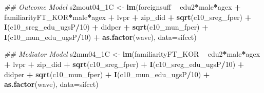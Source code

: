 \documentclass[
]{article}
\newenvironment{Shaded}{\begin{snugshade}}{\end{snugshade}}
\newcommand{\CommentTok}[1]{\textcolor[rgb]{0.56,0.35,0.01}{\textit{#1}}}
\newcommand{\DataTypeTok}[1]{\textcolor[rgb]{0.13,0.29,0.53}{#1}}
\newcommand{\DecValTok}[1]{\textcolor[rgb]{0.00,0.00,0.81}{#1}}
\newcommand{\KeywordTok}[1]{\textcolor[rgb]{0.13,0.29,0.53}{\textbf{#1}}}
\newcommand{\NormalTok}[1]{#1}
\newcommand{\OperatorTok}[1]{\textcolor[rgb]{0.81,0.36,0.00}{\textbf{#1}}}
\newcommand{\StringTok}[1]{\textcolor[rgb]{0.31,0.60,0.02}{#1}}
\begin{document}
\begin{Shaded}
\begin{Highlighting}[]
\CommentTok{## Outcome Model }
\NormalTok{s2mout04_1C <-}\StringTok{ }\KeywordTok{lm}\NormalTok{(foreignsuff  }\OperatorTok{~}\StringTok{ }\NormalTok{edu2}\OperatorTok{*}\NormalTok{male}\OperatorTok{*}\NormalTok{agex }\OperatorTok{+}\StringTok{ }\NormalTok{familiarityFT_KOR}\OperatorTok{*}\NormalTok{male}\OperatorTok{*}\NormalTok{agex }\OperatorTok{+}\StringTok{ }\NormalTok{lvpr }\OperatorTok{+}\StringTok{  }
\StringTok{                    }\NormalTok{zip_did }\OperatorTok{+}\StringTok{ }\KeywordTok{sqrt}\NormalTok{(c10_sreg_fper) }\OperatorTok{+}\StringTok{ }\KeywordTok{I}\NormalTok{(c10_sreg_edu_ugsP}\OperatorTok{/}\DecValTok{10}\NormalTok{) }\OperatorTok{+}\StringTok{ }
\StringTok{                    }\NormalTok{didper }\OperatorTok{+}\StringTok{ }\KeywordTok{sqrt}\NormalTok{(c10_mun_fper) }\OperatorTok{+}\StringTok{ }\KeywordTok{I}\NormalTok{(c10_mun_edu_ugsP}\OperatorTok{/}\DecValTok{10}\NormalTok{) }\OperatorTok{+}\StringTok{ }
\StringTok{                    }\KeywordTok{as.factor}\NormalTok{(wave), }\DataTypeTok{data=}\NormalTok{sifcct)}

\CommentTok{## Mediator Model}
\NormalTok{s2mm04_1C <-}\StringTok{ }\KeywordTok{lm}\NormalTok{(familiarityFT_KOR  }\OperatorTok{~}\StringTok{ }\NormalTok{edu2}\OperatorTok{*}\NormalTok{male}\OperatorTok{*}\NormalTok{agex }\OperatorTok{+}\StringTok{ }\NormalTok{lvpr }\OperatorTok{+}\StringTok{  }
\StringTok{                  }\NormalTok{zip_did }\OperatorTok{+}\StringTok{ }\KeywordTok{sqrt}\NormalTok{(c10_sreg_fper) }\OperatorTok{+}\StringTok{ }\KeywordTok{I}\NormalTok{(c10_sreg_edu_ugsP}\OperatorTok{/}\DecValTok{10}\NormalTok{) }\OperatorTok{+}\StringTok{ }
\StringTok{                  }\NormalTok{didper }\OperatorTok{+}\StringTok{ }\KeywordTok{sqrt}\NormalTok{(c10_mun_fper) }\OperatorTok{+}\StringTok{ }\KeywordTok{I}\NormalTok{(c10_mun_edu_ugsP}\OperatorTok{/}\DecValTok{10}\NormalTok{) }\OperatorTok{+}\StringTok{ }
\StringTok{                  }\KeywordTok{as.factor}\NormalTok{(wave), }\DataTypeTok{data=}\NormalTok{sifcct)}


\end{Highlighting}
\end{Shaded}
\end{document}
